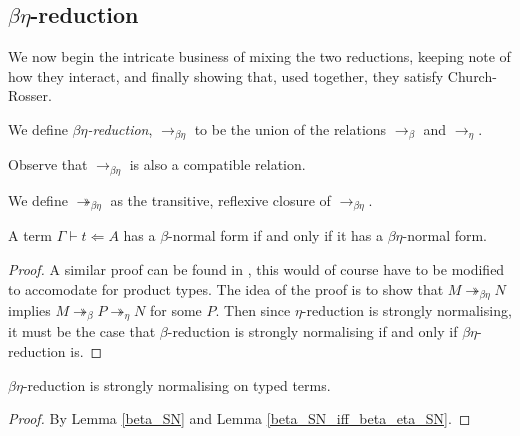 
\subsection{$\beta \eta$-reduction}

We now begin the intricate business of mixing the two reductions, keeping note of how they interact, and finally showing that, used together, they satisfy Church-Rosser.

\begin{defin}
    We define \emph{$\beta\eta$-reduction}, $\to_{\beta\eta}$ to be the union of the relations $\to_\beta$ and $\to_\eta$.
\end{defin}

\begin{remark}
    Observe that $\to_{\beta\eta}$ is also a compatible relation.
\end{remark}

\begin{defin}
    We define $\twoheadrightarrow_{\beta\eta}$ as the transitive, reflexive closure of $\to_{\beta\eta}$.
\end{defin}

\begin{lemma}\label{beta_SN_iff_beta_eta_SN}
    A term $\Gamma \vdash t \Leftarrow A$ has a $\beta$-normal form if and only if it has a $\beta \eta$-normal form.
\end{lemma}

\begin{proof}
    A similar proof can be found in \cite[Corollary 15.1.5]{barendregt1984lambda}, this would of course have to be modified to accomodate for product types. The idea of the proof is to show that $M \twoheadrightarrow_{\beta\eta} N$ implies $M \twoheadrightarrow_{\beta} P \twoheadrightarrow_{\eta} N$ for some $P$. Then since $\eta$-reduction is strongly normalising, it must be the case that $\beta$-reduction is strongly normalising if and only if $\beta \eta$-reduction is.
\end{proof}

\begin{cor}\label{beta_eta_SN}
    $\beta \eta$-reduction is strongly normalising on typed terms.
\end{cor}

\begin{proof}
    By Lemma \ref{beta_SN} and Lemma \ref{beta_SN_iff_beta_eta_SN}.
\end{proof}

